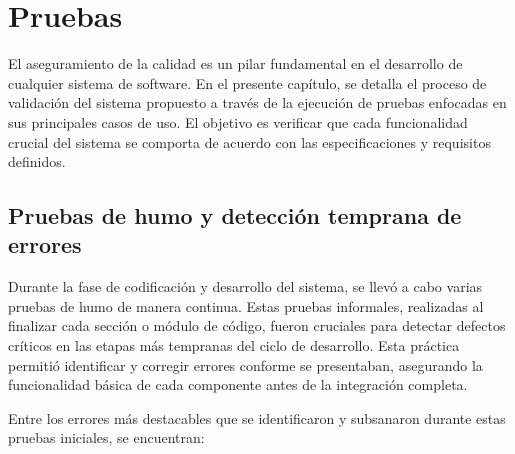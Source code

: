 \chapter{Pruebas}

El aseguramiento de la calidad es un pilar fundamental en el desarrollo de cualquier sistema de software. En el presente capítulo, se detalla el proceso de validación del sistema propuesto a través de la ejecución de pruebas enfocadas en sus principales casos de uso. El objetivo es verificar que cada funcionalidad crucial del sistema se comporta de acuerdo con las especificaciones y requisitos definidos. 

\section{Pruebas de humo y detección temprana de errores}

Durante la fase de codificación y desarrollo del sistema, se llevó a cabo varias pruebas de humo de manera continua. Estas pruebas informales, realizadas al finalizar cada sección o módulo de código, fueron cruciales para detectar defectos críticos en las etapas más tempranas del ciclo de desarrollo. Esta práctica permitió identificar y corregir errores conforme se presentaban, asegurando la funcionalidad básica de cada componente antes de la integración completa.

Entre los errores más destacables que se identificaron y subsanaron durante estas pruebas iniciales, se encuentran:

